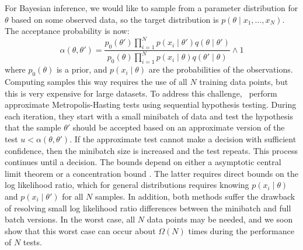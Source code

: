 \documentclass{article}
\begin{document}
For Bayesian inference, we would like to sample from a parameter distribution
for $\theta$ based on some observed data, so the target distribution is
$p(\theta \mid x_1, \ldots, x_N)$. The acceptance probability is now:
\begin{equation}\label{eq:acceptance_probability}
    \alpha(\theta,\theta') = 
    \frac{p_0(\theta')\prod_{i=1}^N p(x_i \mid \theta')q(\theta \mid
    \theta')}{p_0(\theta)\prod_{i=1}^N p(x_i \mid \theta)q(\theta' \mid\theta)}
    \wedge 1
\end{equation}
where $p_0(\theta)$ is a prior, and $p(x_i \mid \theta)$ are the probabilities
of the observations. Computing samples this way requires the use of all $N$
training data points, but this is very expensive for large datasets. To address
this challenge,~\cite{cutting_mh_2014,icml2014c1_bardenet14} perform approximate
Metropolis-Hasting tests using sequential hypothesis testing. During each
iteration, they start with a small minibatch of data and test the hypothesis
that the sample $\theta'$ should be accepted based on an approximate version of
the test $u < \alpha(\theta,\theta')$. If the approximate test cannot make a
decision with sufficient confidence, then the minibatch size is increased and
the test repeats. This process continues until a decision. The bounds depend on
either a asymptotic central limit theorem \cite{cutting_mh_2014} or a
concentration bound \cite{icml2014c1_bardenet14}. The latter requires direct
bounds on the log likelihood ratio, which for general distributions requires
knowing $p(x_i \mid \theta)$ and $p(x_i \mid \theta')$ for all $N$ samples. In
addition, both methods suffer the drawback of resolving small log likelihood
ratio differences between the minibatch and full batch versions.  In the worst
case, all $N$ data points may be needed, and we soon show that this worst case
can occur about $\Omega(N)$ times during the performance of $N$ tests.
\end{document}
